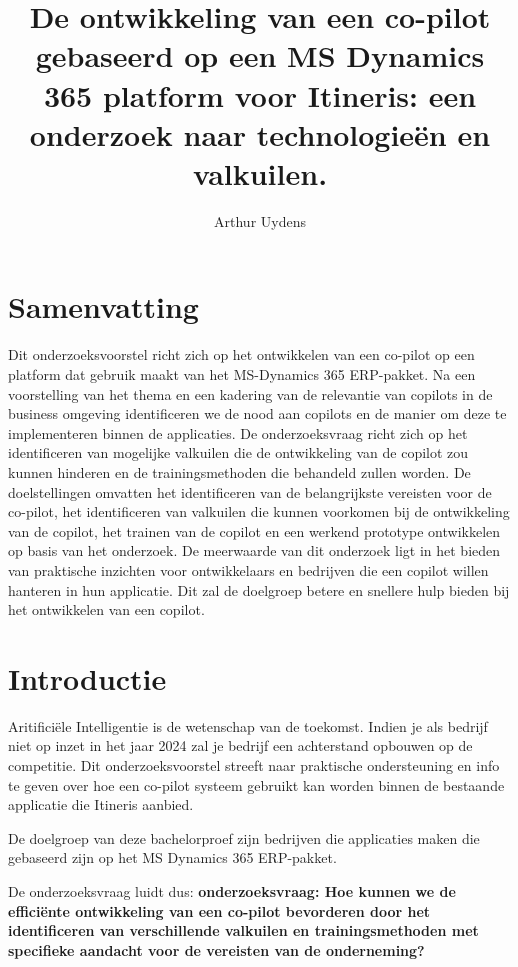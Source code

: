 \documentclass{hogent-article}
\title{De ontwikkeling van een co-pilot gebaseerd op een MS Dynamics 365 platform voor Itineris: een onderzoek naar technologieën en valkuilen. }
\author{Arthur Uydens }
\begin{document}
\section{Samenvatting}
Dit onderzoeksvoorstel richt zich op het ontwikkelen van een co-pilot op een platform dat gebruik maakt van het MS-Dynamics 365 ERP-pakket. Na een voorstelling van het thema en een kadering van de relevantie van copilots in de business omgeving identificeren we de nood aan copilots en de manier om deze te implementeren binnen de applicaties.
De onderzoeksvraag richt zich op het identificeren van mogelijke valkuilen die de ontwikkeling van de copilot zou kunnen hinderen en de trainingsmethoden die behandeld zullen worden. De doelstellingen omvatten het identificeren van de belangrijkste vereisten voor de co-pilot, het identificeren van valkuilen die kunnen voorkomen bij de ontwikkeling van de copilot, het trainen van de copilot en een werkend prototype ontwikkelen op basis van het onderzoek. De meerwaarde van dit onderzoek ligt in het bieden van praktische inzichten voor ontwikkelaars en bedrijven die een copilot willen hanteren in hun applicatie. Dit zal de doelgroep betere en snellere hulp bieden bij het ontwikkelen van een copilot. 

\section{Introductie}
Aritificiële Intelligentie is de wetenschap van de toekomst. Indien je als bedrijf niet op inzet in het jaar 2024 zal je bedrijf een achterstand opbouwen op de competitie. Dit onderzoeksvoorstel streeft naar praktische ondersteuning en info te geven over hoe een co-pilot systeem gebruikt kan worden binnen de bestaande applicatie die Itineris aanbied.  

De doelgroep van deze bachelorproef zijn bedrijven die applicaties maken die gebaseerd zijn op het MS Dynamics 365 ERP-pakket. 

De onderzoeksvraag luidt dus: \textbf{
  onderzoeksvraag: Hoe kunnen we de efficiënte ontwikkeling van een co-pilot bevorderen door het identificeren van verschillende valkuilen en trainingsmethoden met specifieke aandacht voor de vereisten van de onderneming? 
}
\end{document}
